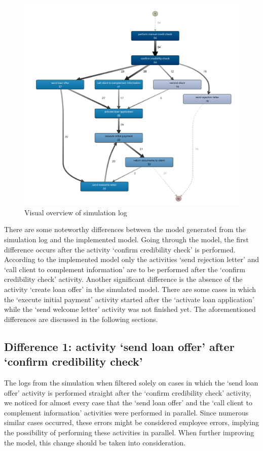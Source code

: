 \documentclass[a4paper]{article} %
\begin{document}
\begin{figure}
\centering
\includegraphics[scale=0.5,frame]{conformance}
\caption{Visual overview of simulation log}
\label{conformance}
\end{figure}

There are some noteworthy differences between the model generated from the simulation log and the implemented model. Going through the model, the first difference occurs after the activity ‘confirm credibility check’ is performed. According to the implemented model only the activities ‘send rejection letter’ and ‘call client to complement information’ are to be performed after the ‘confirm credibility check’ activity. Another significant difference is the absence of the activity ‘create loan offer’ in the simulated model. There are some cases in which the ‘execute initial payment’ activity started after the ‘activate loan application’ while the ‘send welcome letter’ activity was not finished yet. The aforementioned differences are discussed in the following sections.

\subsection{Difference 1: activity ‘send loan offer’ after ‘confirm credibility check’}
The logs from the simulation when filtered solely on cases in which the ‘send loan offer’ activity is performed straight after the ‘confirm credibility check’ activity, we noticed for almost every case that the ‘send loan offer’ and the ‘call client to complement information’ activities were performed in parallel. Since numerous similar cases occurred, these errors might be considered employee errors, implying the possibility of performing these activities in parallel. When further improving the model, this change should be taken into consideration.
\end{document}
